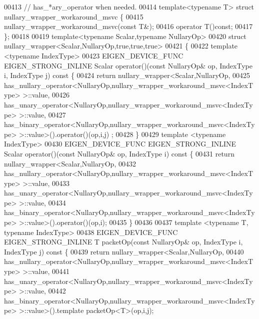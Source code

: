\begin{DoxyCode}
00413 \textcolor{comment}{// has\_*ary\_operator when needed.}
00414 \textcolor{keyword}{template}<\textcolor{keyword}{typename} T> \textcolor{keyword}{struct }nullary\_wrapper\_workaround\_msvc \{
00415   nullary\_wrapper\_workaround\_msvc(\textcolor{keyword}{const} T&);
00416   \textcolor{keyword}{operator} T()\textcolor{keyword}{const};
00417 \};
00418 
00419 \textcolor{keyword}{template}<\textcolor{keyword}{typename} Scalar,\textcolor{keyword}{typename} NullaryOp>
00420 \textcolor{keyword}{struct }nullary\_wrapper<Scalar,NullaryOp,true,true,true>
00421 \{
00422   \textcolor{keyword}{template} <\textcolor{keyword}{typename} IndexType>
00423   EIGEN\_DEVICE\_FUNC EIGEN\_STRONG\_INLINE Scalar operator()(\textcolor{keyword}{const} NullaryOp& op, IndexType i, IndexType j)\textcolor{keyword}{
       const }\{
00424     \textcolor{keywordflow}{return} nullary\_wrapper<Scalar,NullaryOp,
00425     has\_nullary\_operator<NullaryOp,nullary\_wrapper\_workaround\_msvc<IndexType> >::value,
00426     has\_unary\_operator<NullaryOp,nullary\_wrapper\_workaround\_msvc<IndexType> >::value,
00427     has\_binary\_operator<NullaryOp,nullary\_wrapper\_workaround\_msvc<IndexType> >::value>().\textcolor{keyword}{operator}()(op,i,j)
      ;
00428   \}
00429   \textcolor{keyword}{template} <\textcolor{keyword}{typename} IndexType>
00430   EIGEN\_DEVICE\_FUNC EIGEN\_STRONG\_INLINE Scalar operator()(\textcolor{keyword}{const} NullaryOp& op, IndexType i)\textcolor{keyword}{ const }\{
00431     \textcolor{keywordflow}{return} nullary\_wrapper<Scalar,NullaryOp,
00432     has\_nullary\_operator<NullaryOp,nullary\_wrapper\_workaround\_msvc<IndexType> >::value,
00433     has\_unary\_operator<NullaryOp,nullary\_wrapper\_workaround\_msvc<IndexType> >::value,
00434     has\_binary\_operator<NullaryOp,nullary\_wrapper\_workaround\_msvc<IndexType> >::value>().\textcolor{keyword}{operator}()(op,i);
00435   \}
00436 
00437   \textcolor{keyword}{template} <\textcolor{keyword}{typename} T, \textcolor{keyword}{typename} IndexType>
00438   EIGEN\_DEVICE\_FUNC EIGEN\_STRONG\_INLINE T packetOp(\textcolor{keyword}{const} NullaryOp& op, IndexType i, IndexType j)\textcolor{keyword}{ const }\{
00439     \textcolor{keywordflow}{return} nullary\_wrapper<Scalar,NullaryOp,
00440     has\_nullary\_operator<NullaryOp,nullary\_wrapper\_workaround\_msvc<IndexType> >::value,
00441     has\_unary\_operator<NullaryOp,nullary\_wrapper\_workaround\_msvc<IndexType> >::value,
00442     has\_binary\_operator<NullaryOp,nullary\_wrapper\_workaround\_msvc<IndexType> >::value>().\textcolor{keyword}{template} 
      packetOp<T>(op,i,j);

\end{DoxyCode}
